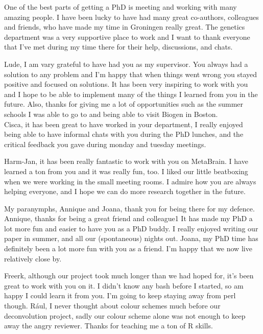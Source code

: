\begin{appendices}
One of the best parts of getting a PhD is meeting and working with many amazing people. I have been lucky to have had many great co-authors, colleagues and friends, who have made my time in Groningen really great. The genetics department was a very supportive place to work and I want to thank everyone that I've met during my time there for their help, discussions, and chats.

Lude, I am vary grateful to have had you as my supervisor. You always had a solution to any problem and I'm happy that when things went wrong you stayed positive and focused on solutions. It has been very inspiring to work with you and I hope to be able to implement many of the things I learned from you in the future. Also, thanks for giving me a lot of opportunities such as the summer schools I was able to go to and being able to visit Biogen in Boston.  \\
Cisca, it has been great to have worked in your department, I really enjoyed being able to have informal chats with you during the PhD lunches, and the critical feedback you gave during monday and tuesday meetings.

Harm-Jan, it has been really fantastic to work with you on MetaBrain. I have learned a ton from you and it was really fun, too. I liked our little beatboxing when we were working in the small meeting rooms. I admire how you are always helping everyone, and I hope we can do more research together in the future.

My paranymphs, Annique and Joana, thank you for being there for my defence. Annique, thanks for being a great friend and colleague1 It has made my PhD a lot more fun and easier to have you as a PhD buddy. I really enjoyed writing our paper in summer, and all our (spontaneous) nights out. Joana, my PhD time has definitely been a lot more fun with you as a friend. I'm happy that we now live relatively close by.

Freerk, although our project took much longer than we had hoped for, it's been great to work with you on it. I didn't know any bash before I started, so am happy I could learn it from you. I'm going to keep staying away from perl though. R\'aul, I never thought about colour schemes much before our deconvolution project, sadly our colour scheme alone was not enough to keep away the angry reviewer. Thanks for teaching me a ton of R skills. 


\end{appendices}

